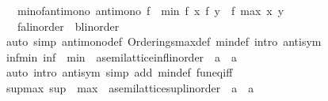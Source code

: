 \begin{isabellebody}
\ \ \ min{\isacharunderscore}{\kern0pt}of{\isacharunderscore}{\kern0pt}antimono{\isacharcolon}{\kern0pt}\ {\isachardoublequoteopen}antimono\ f\ {\isasymLongrightarrow}\ min\ {\isacharparenleft}{\kern0pt}f\ x{\isacharparenright}{\kern0pt}\ {\isacharparenleft}{\kern0pt}f\ y{\isacharparenright}{\kern0pt}\ {\isacharequal}{\kern0pt}\ f\ {\isacharparenleft}{\kern0pt}max\ x\ y{\isacharparenright}{\kern0pt}{\isachardoublequoteclose}\isanewline
\ \ \ f{\isacharcolon}{\kern0pt}{\isacharcolon}{\kern0pt}{\isachardoublequoteopen}{\isacharprime}{\kern0pt}a{\isacharcolon}{\kern0pt}{\isacharcolon}{\kern0pt}linorder\ {\isasymRightarrow}\ {\isacharprime}{\kern0pt}b{\isacharcolon}{\kern0pt}{\isacharcolon}{\kern0pt}linorder{\isachardoublequoteclose}\isanewline
%
\isadelimproof
\ \ %
\endisadelimproof
%
\isatagproof
{}\isamarkupfalse%
\ {\isacharparenleft}{\kern0pt}auto\ simp{\isacharcolon}{\kern0pt}\ antimono{\isacharunderscore}{\kern0pt}def\ Orderings{\isachardot}{\kern0pt}max{\isacharunderscore}{\kern0pt}def\ min{\isacharunderscore}{\kern0pt}def\ intro{\isacharbang}{\kern0pt}{\isacharcolon}{\kern0pt}\ antisym{\isacharparenright}{\kern0pt}%
\endisatagproof
{\isafoldproof}%
%
\isadelimproof
\isanewline
%
\endisadelimproof
\isanewline
{}\isamarkupfalse%
\ inf{\isacharunderscore}{\kern0pt}min{\isacharcolon}{\kern0pt}\ {\isachardoublequoteopen}inf\ {\isacharequal}{\kern0pt}\ {\isacharparenleft}{\kern0pt}min\ {\isacharcolon}{\kern0pt}{\isacharcolon}{\kern0pt}\ {\isacharprime}{\kern0pt}a{\isacharcolon}{\kern0pt}{\isacharcolon}{\kern0pt}{\isacharbraceleft}{\kern0pt}semilattice{\isacharunderscore}{\kern0pt}inf{\isacharcomma}{\kern0pt}linorder{\isacharbraceright}{\kern0pt}\ {\isasymRightarrow}\ {\isacharprime}{\kern0pt}a\ {\isasymRightarrow}\ {\isacharprime}{\kern0pt}a{\isacharparenright}{\kern0pt}{\isachardoublequoteclose}\isanewline
%
\isadelimproof
\ \ %
\endisadelimproof
%
\isatagproof
{}\isamarkupfalse%
\ {\isacharparenleft}{\kern0pt}auto\ intro{\isacharcolon}{\kern0pt}\ antisym\ simp\ add{\isacharcolon}{\kern0pt}\ min{\isacharunderscore}{\kern0pt}def\ fun{\isacharunderscore}{\kern0pt}eq{\isacharunderscore}{\kern0pt}iff{\isacharparenright}{\kern0pt}%
\endisatagproof
{\isafoldproof}%
%
\isadelimproof
\isanewline
%
\endisadelimproof
\isanewline
{}\isamarkupfalse%
\ sup{\isacharunderscore}{\kern0pt}max{\isacharcolon}{\kern0pt}\ {\isachardoublequoteopen}sup\ {\isacharequal}{\kern0pt}\ {\isacharparenleft}{\kern0pt}max\ {\isacharcolon}{\kern0pt}{\isacharcolon}{\kern0pt}\ {\isacharprime}{\kern0pt}a{\isacharcolon}{\kern0pt}{\isacharcolon}{\kern0pt}{\isacharbraceleft}{\kern0pt}semilattice{\isacharunderscore}{\kern0pt}sup{\isacharcomma}{\kern0pt}linorder{\isacharbraceright}{\kern0pt}\ {\isasymRightarrow}\ {\isacharprime}{\kern0pt}a\ {\isasymRightarrow}\ {\isacharprime}{\kern0pt}a{\isacharparenright}{\kern0pt}{\isachardoublequoteclose}\isanewline

\end{isabellebody}
